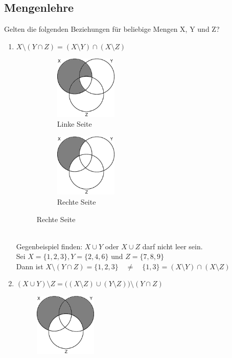 \documentclass[11pt, a4paper]{article}
\begin{document}
\subsection{Mengenlehre}
Gelten die folgenden Beziehungen für beliebige Mengen X, Y und Z?
\begin{enumerate}
	\item $X \setminus (Y \cap Z) = (X \setminus Y) \cap (X \setminus Z)$
	\begin{figure}[h!]
		\centering
		\begin{subfigure}{3cm}
			\includegraphics[height=3cm]{MengenlehreAufgabe1a}
			\caption{Linke Seite}
		\end{subfigure}
		\hspace{2cm}
		\begin{subfigure}{3cm}
			\includegraphics[height=3cm]{MengenlehreAufgabe1b}
			\caption{Rechte Seite}
		\end{subfigure}
	\end{figure} \\
	Gegenbeispiel finden: $X \cup Y$ oder $X \cup Z$ darf nicht leer sein. \\
	Sei $X = \{1,2,3\}, Y = \{2,4,6\}$ und $Z = \{7,8,9\}$ \\
	Dann ist $X \setminus (Y \cap Z) = \{1,2,3\} \quad \neq \quad \{1,3\} = (X \setminus Y) \cap (X \setminus Z)$
	\item $(X \cup Y) \setminus Z = \Big((X \setminus Z) \cup (Y \setminus Z)\Big) \setminus (Y \cap Z)$
	\begin{figure}[h!]
		\centering
		\includegraphics[height=3cm]{MengenlehreAufgabe2}

\end{figure}
\end{enumerate}
\end{document}
